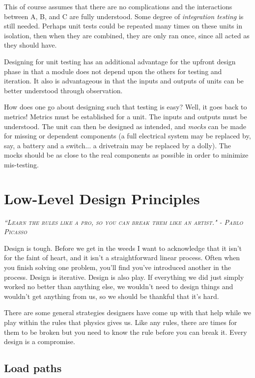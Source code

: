 This of course assumes that there are no complications and the interactions between A, B, and C are fully understood. Some degree of \textit{integration testing} is still needed. Perhaps unit tests could be repeated many times on these units in isolation, then when they are combined, they are only ran once, since all acted as they should have.

Designing for unit testing has an additional advantage for the upfront design phase in that a module does not depend upon the others for testing and iteration. It also is advantageous in that the inputs and outputs of units can be better understood through observation.

How does one go about designing such that testing is easy? Well, it goes back to metrics! Metrics must be established for a unit. The inputs and outputs must be understood. The unit can then be designed as intended, and \textit{mocks} can be made for missing or dependent components (a full electrical system may be replaced by, say, a battery and a switch... a drivetrain may be replaced by a dolly). The mocks should be as close to the real components as possible in order to minimize mis-testing.

\chapter{Low-Level Design Principles}

 {\slshape \scshape ``Learn the rules like a pro, so you can break them like an artist." - Pablo Picasso}
 
Design is tough. Before we get in the weeds I want to acknowledge that it isn't for the faint of heart, and it isn't a straightforward linear process. Often when you finish solving one problem, you'll find you've introduced another in the process. Design is iterative. Design is also play. If everything we did just simply worked no better than anything else, we wouldn't need to design things and wouldn't get anything from us, so we should be thankful that it's hard.

There are some general strategies designers have come up with that help while we play within the rules that physics gives us. Like any rules, there are times for them to be broken but you need to know the rule before you can break it. Every design is a compromise.

\section{Load paths}

